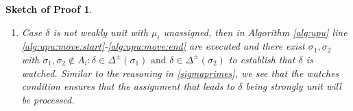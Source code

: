 \documentclass[final]{vutinfth} %
\newcommand{\todo}[1]{{\color{red}\textbf{TODO: {#1}}}} %
\newtheorem{proof-sketch}{Sketch of Proof}[chapter]
\newcommand{\negstrong}[1]{\overline{#1}^s}
\newcommand{\negweak}[1]{\overline{#1}^w}
\newcommand{\ass}{A}
\newcommand{\bT}{\mathbf{T}}
\newcommand{\bF}{\mathbf{F}}
\newcommand{\cdal}{C_\alpha}
\newcommand{\dpm}{\Delta^\pm}
\newcommand{\dal}{\Delta^\alpha}
\newcommand{\headf}{H}
\newcommand{\bodyf}{B}
\newcommand{\sgl}{\mu}
\newcommand{\bsgl}{\sigma}
\begin{document}
\begin{proof-sketch}
\begin{enumerate}
\begin{enumerate}
\begin{enumerate}
\begin{enumerate}
\begin{itemize}
	\end{itemize}
	
	\item Case $\delta$ is not weakly unit with $\sgl_i$ unassigned, then in Algorithm \ref{alg:upu} line \ref{alg:upu:move:start}-\ref{alg:upu:move:end} are executed and there exist $\bsgl_1, \bsgl_2$ with $\bsgl_1, \bsgl_2 \not \in \ass_i : \delta \in \dpm(\bsgl_1) \text{ and } \delta \in \dpm(\bsgl_2)$ to establish that $\delta$ is watched. Similar to the reasoning in \ref{sigmaprimes}, we see that the watches condition ensures that the assignment that leads to $\delta$ being strongly unit will be processed.%
	
	\end{enumerate}
	
		
		
			
			
			
			



\end{enumerate}
\end{enumerate}
\end{enumerate}
\end{proof-sketch}
\end{document}
